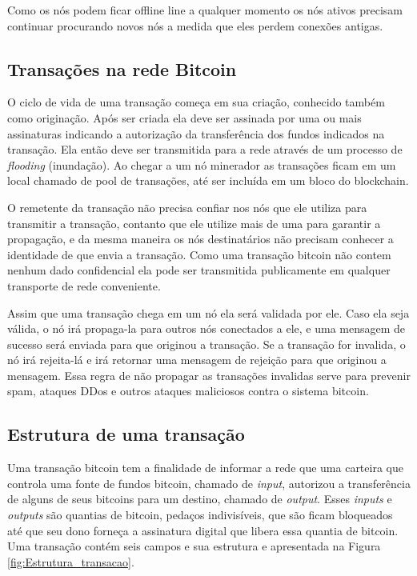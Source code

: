 \documentclass[conference,compsoc]{IEEEtran}
\begin{document}
Como os nós podem ficar offline line a qualquer momento os nós ativos precisam continuar procurando novos nós a medida que eles perdem conexões antigas.


\subsection{Transações na rede Bitcoin}
\label{section:Transações na rede Bitcoin}

O ciclo de vida de uma transação começa em sua criação, conhecido também como originação. Após ser criada ela deve ser assinada por uma ou mais assinaturas indicando a autorização da transferência dos fundos indicados na transação. Ela então deve ser transmitida para a rede através de um processo de \textit{flooding} (inundação). Ao chegar a um nó minerador as transações ficam em um local chamado de pool de transações, até ser incluída em um bloco do blockchain.

O remetente da transação não precisa confiar nos nós que ele utiliza para transmitir a transação, contanto que ele utilize mais de uma para garantir a propagação, e da mesma maneira os nós destinatários não precisam conhecer a identidade de que envia a transação. Como uma transação bitcoin não contem nenhum dado confidencial ela pode ser transmitida publicamente em qualquer transporte de rede conveniente.

Assim que uma transação chega em um nó ela será validada por ele. Caso ela seja válida, o nó irá propaga-la para outros nós conectados a ele, e uma mensagem de sucesso será enviada para que originou a transação. Se a transação for invalida, o nó irá rejeita-lá e irá retornar uma mensagem de rejeição para que originou a mensagem. Essa regra de não propagar as transações invalidas serve para prevenir spam, ataques DDos e outros ataques maliciosos contra o sistema bitcoin.



\subsection*{Estrutura de uma transação}

Uma transação bitcoin tem a finalidade de informar a rede que uma carteira que controla uma fonte de fundos bitcoin, chamado de \textit{input},  autorizou a transferência de alguns de seus bitcoins para um destino, chamado de \textit{output}. Esses \textit{inputs} e \textit{outputs} são quantias de bitcoin, pedaços indivisíveis, que são ficam bloqueados até que seu dono forneça a assinatura digital que libera essa quantia de bitcoin. Uma transação contém seis campos e sua estrutura e apresentada na Figura \ref{fig:Estrutura_transacao}.
\end{document}
